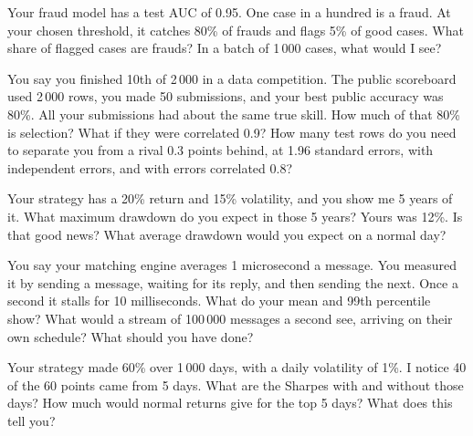\begin{question}\label{iq:iv2:your-strategy-and-your-project:13}
Your fraud model has a test AUC of 0.95. One case in a hundred is a fraud. At your chosen threshold, it catches 80\% of frauds and flags 5\% of good cases. What share of flagged cases are frauds? In a batch of 1\,000 cases, what would I see?
\end{question}

\begin{question}\label{iq:iv2:your-strategy-and-your-project:14}
You say you finished 10th of 2\,000 in a data competition. The public scoreboard used 2\,000 rows, you made 50 submissions, and your best public accuracy was 80\%. All your submissions had about the same true skill. How much of that 80\% is selection? What if they were correlated 0.9? How many test rows do you need to separate you from a rival 0.3 points behind, at 1.96 standard errors, with independent errors, and with errors correlated 0.8?
\end{question}

\begin{question}\label{iq:iv2:your-strategy-and-your-project:15}
Your strategy has a 20\% return and 15\% volatility, and you show me 5 years of it. What maximum drawdown do you expect in those 5 years? Yours was 12\%. Is that good news? What average drawdown would you expect on a normal day?
\end{question}

\begin{question}\label{iq:iv2:your-strategy-and-your-project:16}
You say your matching engine averages 1 microsecond a message. You measured it by sending a message, waiting for its reply, and then sending the next. Once a second it stalls for 10 milliseconds. What do your mean and 99th percentile show? What would a stream of 100\,000 messages a second see, arriving on their own schedule? What should you have done?
\end{question}

\begin{question}\label{iq:iv2:your-strategy-and-your-project:17}
Your strategy made 60\% over 1\,000 days, with a daily volatility of 1\%. I notice 40 of the 60 points came from 5 days. What are the Sharpes with and without those days? How much would normal returns give for the top 5 days? What does this tell you?
\end{question}

